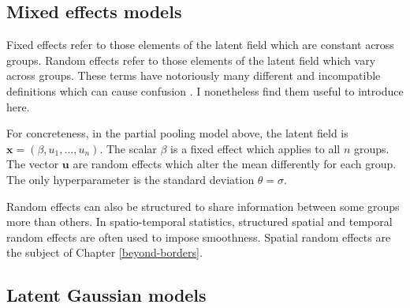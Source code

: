 \documentclass[a4paper, nobind]{templates/ociamthesis}
\newcommand{\bu}{\mathbf{u}}
\newcommand{\x}{\mathbf{x}}
\begin{document}
\hypertarget{mixed-effects-models}{%
\subsection{Mixed effects models}\label{mixed-effects-models}}

Fixed effects refer to those elements of the latent field which are constant across groups.
Random effects refer to those elements of the latent field which vary across groups.
These terms have notoriously many different and incompatible definitions which can cause confusion \autocite{gelman2005analysis}.
I nonetheless find them useful to introduce here.

For concreteness, in the partial pooling model above, the latent field is \(\x = (\beta, u_1, \ldots, u_n)\).
The scalar \(\beta\) is a fixed effect which applies to all \(n\) groups.
The vector \(\bu\) are random effects which alter the mean differently for each group.
The only hyperparameter is the standard deviation \(\theta = \sigma\).

Random effects can also be structured to share information between some groups more than others.
In spatio-temporal statistics, structured spatial and temporal random effects are often used to impose smoothness.
Spatial random effects are the subject of Chapter \ref{beyond-borders}.

\hypertarget{latent-gaussian-models}{%
\subsection{Latent Gaussian models}\label{latent-gaussian-models}}
\end{document}
